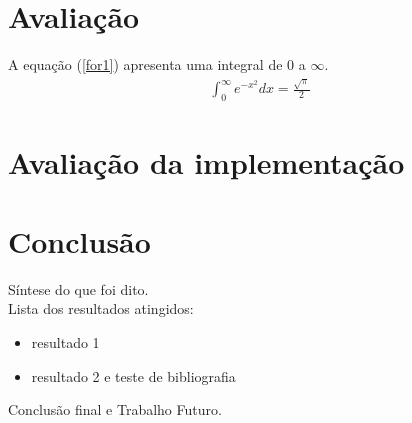 \documentclass[a4paper,12pt]{article}
\begin{document}
\section{Avaliação}
A equação (\ref{for1})  apresenta uma integral de 0 a $\infty$.
\begin{align}
	\label{for1}	\int_0^\infty e^{-x^2} dx=\frac{\sqrt{\pi}}{2}
\end{align}


\section{Avaliação da implementação}

\section{Conclusão}
Síntese do que foi dito.\\
Lista dos resultados atingidos:
\begin{itemize}
\item resultado 1
\item resultado 2 e teste de bibliografia \cite{Bulfinch1998}
\end{itemize}
Conclusão final e Trabalho Futuro.



\end{document}
